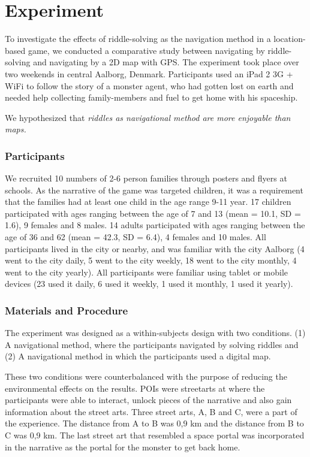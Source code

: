\section{Experiment}

To investigate the effects of riddle-solving as the navigation method in a location-based game, we conducted a comparative study between navigating by riddle-solving and navigating by a 2D map with GPS. The experiment took place over two weekends in central Aalborg, Denmark. Participants used an iPad 2 3G + WiFi to follow the story of a monster agent, who had gotten lost on earth and needed help collecting family-members and fuel to get home with his spaceship.

We hypothesized that \textit{riddles as navigational method are more enjoyable than maps.}

\subsubsection{Participants}

We recruited 10 numbers of 2-6 person families through posters and flyers at schools. 
As the narrative of the game was targeted children, it was a requirement that the families had at least one child in the age range 9-11 year. 17 children participated with ages ranging between the age of 7 and 13 (mean = 10.1, SD = 1.6), 9 females and 8 males. 14 adults participated with ages ranging between the age of 36 and 62 (mean = 42.3, SD = 6.4), 4 females and 10 males.  All participants lived in the city or nearby, and was familiar with the city Aalborg (4 went to the city daily, 5 went to the city weekly, 18 went to the city monthly, 4 went to the city yearly). All participants were familiar using tablet or mobile devices (23 used it daily, 6 used it weekly, 1 used it monthly, 1 used it yearly).


\subsubsection{Materials and Procedure}
The experiment was designed as a within-subjects design with two conditions. (1) A navigational method, where the participants navigated by solving riddles and (2) A navigational method in which the participants used a digital map.

These two conditions were counterbalanced with the purpose of reducing the environmental effects on the results. POIs were streetarts at where the participants were able to interact, unlock pieces of the narrative and also gain information about the street arts. Three street arts, A, B and C, were a part of the experience. The distance from A to B was 0,9 km and the distance from B to C was 0,9 km. The last street art that resembled a space portal was incorporated in the narrative as the portal for the monster to get back home. 

